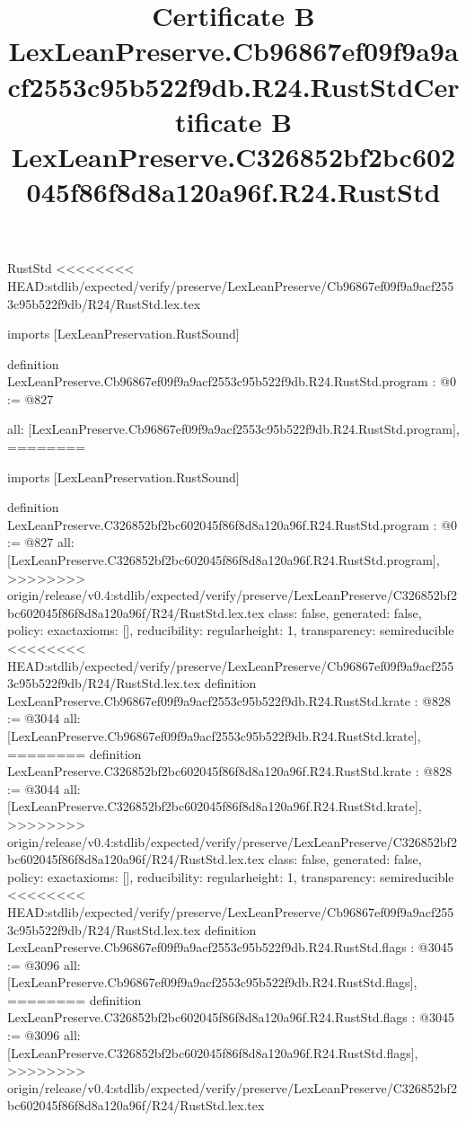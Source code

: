 \begin{lexlean}{RustStd}
<<<<<<<< HEAD:stdlib/expected/verify/preserve/LexLeanPreserve/Cb96867ef09f9a9acf2553c95b522f9db/R24/RustStd.lex.tex
\title{Certificate B LexLeanPreserve.Cb96867ef09f9a9acf2553c95b522f9db.R24.RustStd}
\begin{coremodule}
imports [LexLeanPreservation.RustSound]

definition LexLeanPreserve.Cb96867ef09f9a9acf2553c95b522f9db.R24.RustStd.program : @0 := @827 {
  all: [LexLeanPreserve.Cb96867ef09f9a9acf2553c95b522f9db.R24.RustStd.program],
========
\title{Certificate B LexLeanPreserve.C326852bf2bc602045f86f8d8a120a96f.R24.RustStd}
\begin{coremodule}
imports [LexLeanPreservation.RustSound]

definition LexLeanPreserve.C326852bf2bc602045f86f8d8a120a96f.R24.RustStd.program : @0 := @827 {
  all: [LexLeanPreserve.C326852bf2bc602045f86f8d8a120a96f.R24.RustStd.program],
>>>>>>>> origin/release/v0.4:stdlib/expected/verify/preserve/LexLeanPreserve/C326852bf2bc602045f86f8d8a120a96f/R24/RustStd.lex.tex
  class: false,
  generated: false,
  policy: exact{axioms: []},
  reducibility: regular{height: 1},
  transparency: semireducible
}
<<<<<<<< HEAD:stdlib/expected/verify/preserve/LexLeanPreserve/Cb96867ef09f9a9acf2553c95b522f9db/R24/RustStd.lex.tex
definition LexLeanPreserve.Cb96867ef09f9a9acf2553c95b522f9db.R24.RustStd.krate : @828 := @3044 {
  all: [LexLeanPreserve.Cb96867ef09f9a9acf2553c95b522f9db.R24.RustStd.krate],
========
definition LexLeanPreserve.C326852bf2bc602045f86f8d8a120a96f.R24.RustStd.krate : @828 := @3044 {
  all: [LexLeanPreserve.C326852bf2bc602045f86f8d8a120a96f.R24.RustStd.krate],
>>>>>>>> origin/release/v0.4:stdlib/expected/verify/preserve/LexLeanPreserve/C326852bf2bc602045f86f8d8a120a96f/R24/RustStd.lex.tex
  class: false,
  generated: false,
  policy: exact{axioms: []},
  reducibility: regular{height: 1},
  transparency: semireducible
}
<<<<<<<< HEAD:stdlib/expected/verify/preserve/LexLeanPreserve/Cb96867ef09f9a9acf2553c95b522f9db/R24/RustStd.lex.tex
definition LexLeanPreserve.Cb96867ef09f9a9acf2553c95b522f9db.R24.RustStd.flags : @3045 := @3096 {
  all: [LexLeanPreserve.Cb96867ef09f9a9acf2553c95b522f9db.R24.RustStd.flags],
========
definition LexLeanPreserve.C326852bf2bc602045f86f8d8a120a96f.R24.RustStd.flags : @3045 := @3096 {
  all: [LexLeanPreserve.C326852bf2bc602045f86f8d8a120a96f.R24.RustStd.flags],
>>>>>>>> origin/release/v0.4:stdlib/expected/verify/preserve/LexLeanPreserve/C326852bf2bc602045f86f8d8a120a96f/R24/RustStd.lex.tex
}}}
\end{coremodule}}
\end{coremodule}
\end{lexlean}
